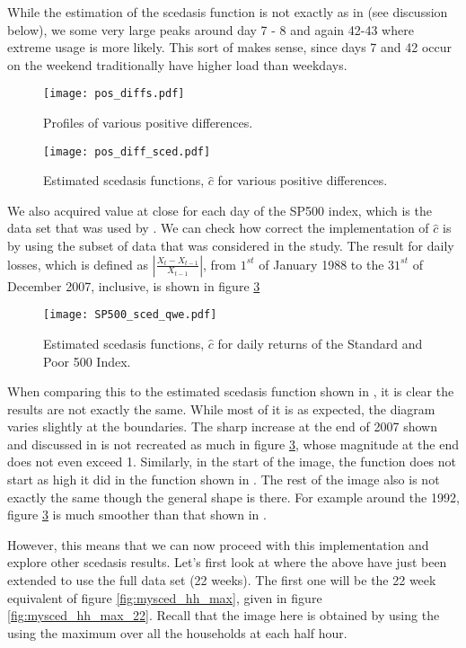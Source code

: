 \documentclass[a4paper]{article}
\begin{document}
While the estimation of the scedasis function is not exactly as in \cite{einmahl16} (see discussion below), we some very large peaks around day 7 - 8 and again 42-43 where extreme usage is more likely. This sort of makes sense, since days 7 and 42 occur on the weekend traditionally have higher load than weekdays.

\begin{figure}
\centering
\texttt{[image: pos\_diffs.pdf]}
\caption{\label{fig:pos_diff} Profiles of various positive differences.}
\end{figure}

\begin{figure}
\centering
\texttt{[image: pos\_diff\_sced.pdf]}
\caption{\label{fig:pos_diff_sced} Estimated scedasis functions, $\hat{c}$ for various positive differences.}
\end{figure}

We also acquired value at close for each day of the SP500 index, which is the data set that was used by \cite{einmahl16}. We can check how correct the implementation of $\hat{c}$ is by using the subset of data that was considered in the study. The result for daily losses, which is defined as $|\frac{X_t - X_{t-1}}{X_{t-1}}|$, from $1^{st}$ of January 1988 to the $31^{st}$ of December 2007, inclusive, is shown in figure \ref{fig:SP500_sced_daily}

\begin{figure}
\centering
\texttt{[image: SP500\_sced\_qwe.pdf]}
\caption{\label{fig:SP500_sced_daily} Estimated scedasis functions, $\hat{c}$ for daily returns of the Standard and Poor 500 Index.}
\end{figure}

When comparing this to the estimated scedasis function shown in \cite{einmahl16}, it is clear the results are not exactly the same. While most of it is as expected, the diagram varies slightly at the boundaries. The sharp increase at the end of 2007 shown and discussed in \cite{einmahl16} is not recreated as much in figure \ref{fig:SP500_sced_daily}, whose magnitude at the end does not even exceed 1. Similarly, in the start of the image, the function does not start as high it did in the function shown in \cite{einmahl16}. The rest of the image also is not exactly the same though the general shape is there. For example around the 1992, figure \ref{fig:SP500_sced_daily} is much smoother than that shown in \cite{einmahl16}.

However, this means that we can now proceed with this implementation and explore other scedasis results. Let's first look at where the above have just been extended to use the full data set (22 weeks). The first one will be the 22 week equivalent of figure \ref{fig:mysced_hh_max}, given in figure \ref{fig:mysced_hh_max_22}. Recall that the image here is obtained by using the using the maximum over all the households at each half hour.
\end{document}
